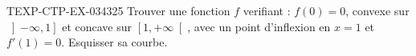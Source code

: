 \begin{exercice}{TEXP-CTP-EX-034}{3}{25}
Trouver une fonction $f$ verifiant : $f(0)=0$, convexe sur $\left]-\infty, 1\right]$ et concave sur $\left[1, +\infty\right[$, avec un point d'inflexion en $x=1$ et $f'(1)=0$. Esquisser sa courbe.

\end{exercice}
